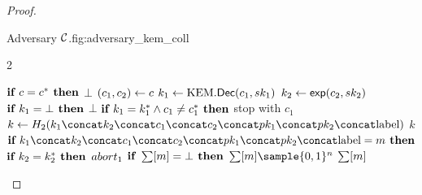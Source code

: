 \documentclass{article}
\begin{document}
\begin{proof}
\begin{itemize}
\begin{gamefigure}{Adversary $\mathcal{C}$.}{fig:adversary_kem_coll}
\begin{games}{2}
\begin{gameenv}{\oracledec}
                                                                                                \State $\textbf{if } c = c^* \textbf{ then}$
                                                                                                    \State \quad \Return $\bot$
                                                                                                    \State $(c_1, c_2) \leftarrow c$
                                                                                                    \State $k_1 \leftarrow \text{KEM}.\textsf{Dec}(c_1, sk_1)$
                                                                                                    \State $k_2 \leftarrow \textsf{exp}(c_2, sk_2)$
                                                                                                    \State $\textbf{if } k_1 = \bot \textbf{ then}$
                                                                                                        \State \quad \Return $\bot$
                                                                                                        \State $\textbf{if } k_1 = k^*_1 \wedge c_1 \neq c^*_1 \textbf{ then}$
                                                                                                            \State \quad stop with $c_1$
                                                                                                            \State $k \assign H_2(\hashinput)$
                                                                                                            \State \Return $k$
                                                                                                            \Statex
                                                                                                            \State \underline{}
                                                                                                            \State $\ifthen{\hashinput = m}$
                                                                                                                \State \quad $\textbf{if } k_2 = k^*_2 \textbf{ then}$
                                                                                                                    \State \qquad $abort_1$
                                                                                                                    \State $\textbf{if } \sum[m] = \bot \textbf{ then}$
                                                                                                                        \State \quad $\ROMtable[m] \sample \bits^{n}$
                                                                                                                        \State \Return $\sum[m]$
                                                                                                                    \end{gameenv}
                                                                                                                \end{games}
                                                                                                            \end{gamefigure}


\end{itemize}
\end{proof}
\end{document}
